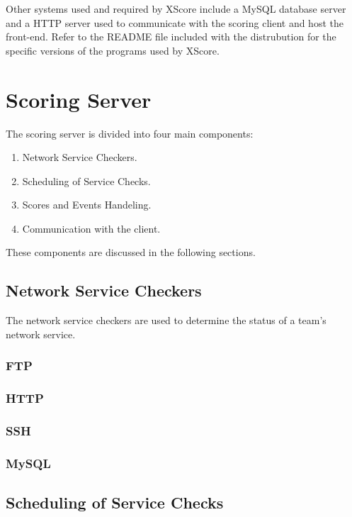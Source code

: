 \documentclass[letterpaper,10pt,english]{manual}
\begin{document}
Other systems used and required by XScore include a MySQL database server and a HTTP server used
to communicate with the scoring client and host the front-end.  Refer to the README file included
with the distrubution for the specific versions of the programs used by XScore.


\section{Scoring Server}

The scoring server is divided into four main components:
\begin{enumerate}
\item {} 
Network Service Checkers.

\item {} 
Scheduling of Service Checks.

\item {} 
Scores and Events Handeling.

\item {} 
Communication with the client.

\end{enumerate}

These components are discussed in the following sections.


\subsection{Network Service Checkers}

The network service checkers are used to determine the status of a team's network service.


\subsubsection{FTP}


\subsubsection{HTTP}


\subsubsection{SSH}


\subsubsection{MySQL}


\subsection{Scheduling of Service Checks}
\end{document}
